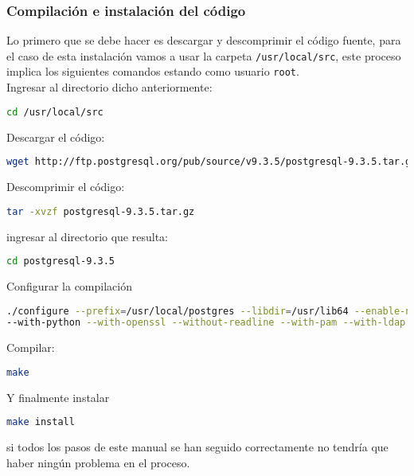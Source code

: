 \documentclass{article}
\begin{document}
\subsubsection{Compilación e instalación del código}
Lo primero que se debe hacer es descargar y descomprimir el código fuente, para el caso de esta instalación vamos a usar la carpeta \verb|/usr/local/src|, este proceso implica los siguientes comandos estando como usuario \verb|root|.\\
Ingresar al directorio dicho anteriormente:\\
\begin{lstlisting}[language=bash, frame=single]
cd /usr/local/src
\end{lstlisting}
Descargar el código:\\
\begin{lstlisting}[language=bash, frame=single]
wget http://ftp.postgresql.org/pub/source/v9.3.5/postgresql-9.3.5.tar.gz
\end{lstlisting}
Descomprimir el código:\\
\begin{lstlisting}[language=bash, frame=single]
tar -xvzf postgresql-9.3.5.tar.gz
\end{lstlisting}
ingresar al directorio que resulta:\\
\begin{lstlisting}[language=bash, frame=single]
cd postgresql-9.3.5
\end{lstlisting}
Configurar la compilación\\
\begin{lstlisting}[language=bash, frame=single]
./configure --prefix=/usr/local/postgres --libdir=/usr/lib64 --enable-nls
--with-python --with-openssl --without-readline --with-pam --with-ldap
\end{lstlisting}
Compilar:\\
\begin{lstlisting}[language=bash, frame=single]
make
\end{lstlisting}
Y finalmente instalar\\
\begin{lstlisting}[language=bash, frame=single]
make install
\end{lstlisting}
si todos los pasos de este manual se han seguido correctamente no tendría que haber ningún problema en el proceso.\\
\end{document}
